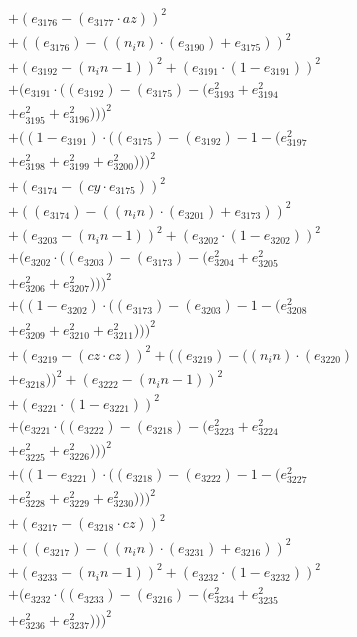\documentclass[10pt, a4paper]{article}
\begin{document}
\begin{small}
\begin{align*}
& + (e_{3176} - (e_{3177}  \cdot  az))^{2} \\
& + ((e_{3176}) - ((n_in)  \cdot  (e_{3190}) + e_{3175}))^{2} \\
& + (e_{3192} - (n_in - 1))^{2} + (e_{3191}  \cdot  (1 - e_{3191}))^{2} \\
& + (e_{3191}  \cdot  ((e_{3192}) - (e_{3175}) - (e_{3193}^{2} + e_{3194}^{2} \\
& + e_{3195}^{2} + e_{3196}^{2})))^{2} \\
& + ((1 - e_{3191})  \cdot  ((e_{3175}) - (e_{3192}) - 1 - (e_{3197}^{2} \\
& + e_{3198}^{2} + e_{3199}^{2} + e_{3200}^{2})))^{2} \\
& + (e_{3174} - (cy  \cdot  e_{3175}))^{2} \\
& + ((e_{3174}) - ((n_in)  \cdot  (e_{3201}) + e_{3173}))^{2} \\
& + (e_{3203} - (n_in - 1))^{2} + (e_{3202}  \cdot  (1 - e_{3202}))^{2} \\
& + (e_{3202}  \cdot  ((e_{3203}) - (e_{3173}) - (e_{3204}^{2} + e_{3205}^{2} \\
& + e_{3206}^{2} + e_{3207}^{2})))^{2} \\
& + ((1 - e_{3202})  \cdot  ((e_{3173}) - (e_{3203}) - 1 - (e_{3208}^{2} \\
& + e_{3209}^{2} + e_{3210}^{2} + e_{3211}^{2})))^{2} \\
& + (e_{3219} - (cz  \cdot  cz))^{2} + ((e_{3219}) - ((n_in)  \cdot  (e_{3220}) \\
& + e_{3218}))^{2} + (e_{3222} - (n_in - 1))^{2} \\
& + (e_{3221}  \cdot  (1 - e_{3221}))^{2} \\
& + (e_{3221}  \cdot  ((e_{3222}) - (e_{3218}) - (e_{3223}^{2} + e_{3224}^{2} \\
& + e_{3225}^{2} + e_{3226}^{2})))^{2} \\
& + ((1 - e_{3221})  \cdot  ((e_{3218}) - (e_{3222}) - 1 - (e_{3227}^{2} \\
& + e_{3228}^{2} + e_{3229}^{2} + e_{3230}^{2})))^{2} \\
& + (e_{3217} - (e_{3218}  \cdot  cz))^{2} \\
& + ((e_{3217}) - ((n_in)  \cdot  (e_{3231}) + e_{3216}))^{2} \\
& + (e_{3233} - (n_in - 1))^{2} + (e_{3232}  \cdot  (1 - e_{3232}))^{2} \\
& + (e_{3232}  \cdot  ((e_{3233}) - (e_{3216}) - (e_{3234}^{2} + e_{3235}^{2} \\
& + e_{3236}^{2} + e_{3237}^{2})))^{2} \\

\end{align*}
\end{small}
\end{document}
